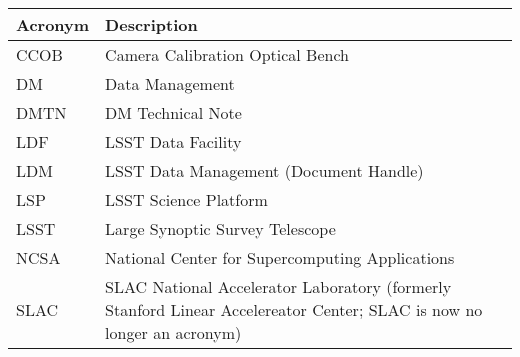 \addtocounter{table}{-1}
\begin{longtable}{p{}p{}}\hline
\textbf{Acronym} & \textbf{Description}  \\\hline

CCOB & Camera Calibration Optical Bench \\\hline
DM & Data Management \\\hline
DMTN & DM Technical Note \\\hline
LDF & LSST Data Facility \\\hline
LDM & LSST Data Management (Document Handle) \\\hline
LSP & LSST Science Platform \\\hline
LSST & Large Synoptic Survey Telescope \\\hline
NCSA & National Center for Supercomputing Applications \\\hline
SLAC & SLAC National Accelerator Laboratory (formerly Stanford Linear Accelereator Center; SLAC is now no longer an acronym) \\\hline
\end{longtable}
